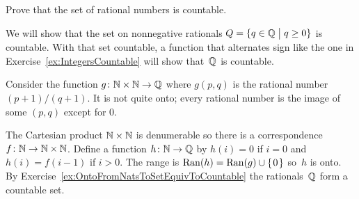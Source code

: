 \begin{ex} Prove that the set of rational numbers is countable.
\begin{ans}
  We will show that the set on nonnegative rationals
  $Q=\{q\in\mathbb{Q} \bigm| q\geq 0\}$ is countable.
  With that set countable, a function that alternates sign like the one in 
  Exercise~\ref{ex:IntegersCountable} will show that~$\mathbb{Q}$ is countable.

  Consider the function $\mbox{$g\colon \mathbb{N}\times\mathbb{N}\to \mathbb{Q}$}$ where $g(p,q)$
  is the rational number $(p+1)/(q+1)$.
  It is not quite onto; every rational number is the image of some
  $(p,q)$ except for $0$.

  The Cartesian product $\mathbb{N}\times\mathbb{N}$ is denumerable so there is a 
  correspondence $\mbox{$f\colon \mathbb{N}\to \mathbb{N}\times\mathbb{N}$}$.
  Define a function $\mbox{$h\colon \mathbb{N}\to \mathbb{Q}$}$ by $h(i)=0$ if $i=0$ and $h(i)=f(i-1)$
  if $i>0$.
  The range is $\operatorname{Ran}(h)=\operatorname{Ran}(g)\cup\mbox{$\{\hspace{0.1em}0\hspace{0.1em}\}$}$ so~$h$ is onto.
  By Exercise~\ref{ex:OntoFromNatsToSetEquivToCountable} the 
  rationals~$\mathbb{Q}$ form a countable set.
\end{ans}
\end{ex}

